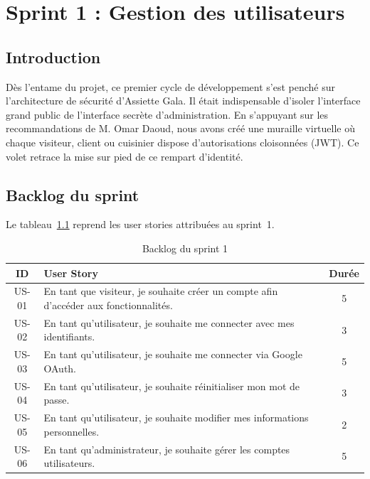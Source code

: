 ﻿%
\chapter{Sprint 1 : Gestion des utilisateurs}

\section{Introduction}

Dès l'entame du projet, ce premier cycle de développement s'est penché sur l'architecture de sécurité d'Assiette Gala. Il était indispensable d'isoler l'interface grand public de l'interface secrète d'administration. En s'appuyant sur les recommandations de M. Omar Daoud, nous avons créé une muraille virtuelle où chaque visiteur, client ou cuisinier dispose d'autorisations cloisonnées (JWT). Ce volet retrace la mise sur pied de ce rempart d'identité.

\section{Backlog du sprint}

Le tableau~\ref{tab:backlog_sprint1} reprend les user stories attribuées au sprint~1.

\begin{table}[H]
    \centering
    \caption{Backlog du sprint 1}
    \label{tab:backlog_sprint1}
    \renewcommand{\arraystretch}{1.3}
    \begin{tabular}{|c|p{8cm}|c|}
        \hline
        \textbf{ID} & \textbf{User Story} & \textbf{Durée} \\
        \hline
        US-01 & En tant que visiteur, je souhaite créer un compte afin d'accéder aux fonctionnalités. & 5 \\
        \hline
        US-02 & En tant qu'utilisateur, je souhaite me connecter avec mes identifiants. & 3 \\
        \hline
        US-03 & En tant qu'utilisateur, je souhaite me connecter via Google OAuth. & 5 \\
        \hline
        US-04 & En tant qu'utilisateur, je souhaite réinitialiser mon mot de passe. & 3 \\
        \hline
        US-05 & En tant qu'utilisateur, je souhaite modifier mes informations personnelles. & 2 \\
        \hline
        US-06 & En tant qu'administrateur, je souhaite gérer les comptes utilisateurs. & 5 \\
        \hline
    \end{tabular}
\end{table}

